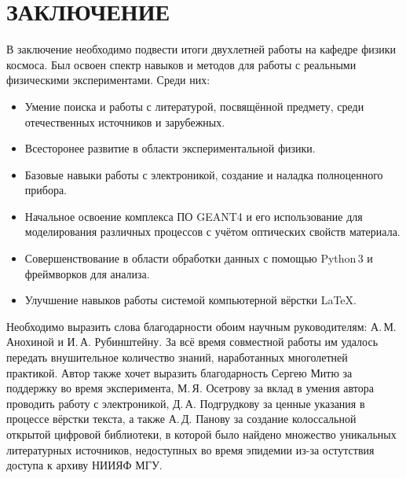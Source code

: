 \documentclass[12pt,a4paper]{report} %
\begin{document}
\chapter*{ЗАКЛЮЧЕНИЕ}
В заключение необходимо подвести итоги двухлетней работы на кафедре физики космоса. Был освоен спектр навыков и методов для работы с реальными физическими экспериментами. Среди них:
\begin{itemize}
	\item Умение поиска и работы с литературой, посвящённой предмету, среди отечественных источников и зарубежных. 
	\item Всесторонее развитие в области экспериментальной физики.
	\item Базовые навыки работы с электроникой, создание и наладка полноценного прибора. 
	\item Начальное освоение комплекса ПО GEANT4 и его использование для моделирования различных процессов с учётом оптических свойств материала.
	\item Совершенствование в области обработки данных с помощью Python\,3 и фреймворков для анализа.
	\item Улучшение навыков работы системой компьютерной вёрстки \LaTeX. 
\end{itemize}
Необходимо выразить слова благодарности обоим научным руководителям: А.\,М. Анохиной и И.\,А. Рубинштейну. За всё время совместной работы им удалось передать внушительное количество знаний, наработанных многолетней практикой.
Автор также хочет выразить благодарность Сергею Митю за поддержку во время эксперимента, М.\,Я. Осетрову за вклад в умения автора проводить работу с электроникой, Д.\,А. Подгрудкову за ценные указания в процессе вёрстки текста, а также А.\,Д. Панову за создание колоссальной открытой цифровой библиотеки, в которой было найдено множество уникальных литературных источников, недоступных во время эпидемии из-за остутствия доступа к архиву НИИЯФ МГУ. 
\end{document}
